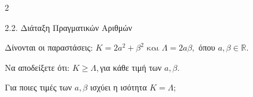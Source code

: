 \begin{ylh}{2}
    \item 2.2. Διάταξη Πραγματικών Αριθμών
\end{ylh}
Δίνονται οι παραστάσεις: $K = 2a^{2} + \beta^{2}\text{ και }\Lambda = 2a\beta,$ όπου $a,\beta \in {\mathbb{R}}.$

\begin{alist}
\item Να αποδείξετε ότι: $K \geq \Lambda,$για κάθε τιμή των $a,\beta.$
\item Για ποιες τιμές των $a,\beta$ ισχύει η ισότητα $K = \Lambda;$
\end{alist}

